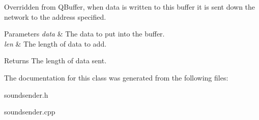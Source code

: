 \-Overridden from \-Q\-Buffer, when data is written to this buffer it is sent down the network to the address specified. 


\begin{DoxyParams}{\-Parameters}
{\em data} & \-The data to put into the buffer. \\
\hline
{\em len} & \-The length of data to add. \\
\hline
\end{DoxyParams}
\begin{DoxyReturn}{\-Returns}
\-The length of data sent. 
\end{DoxyReturn}


\-The documentation for this class was generated from the following files\-:\begin{DoxyCompactItemize}
\item 
soundsender.\-h\item 
soundsender.\-cpp\end{DoxyCompactItemize}
